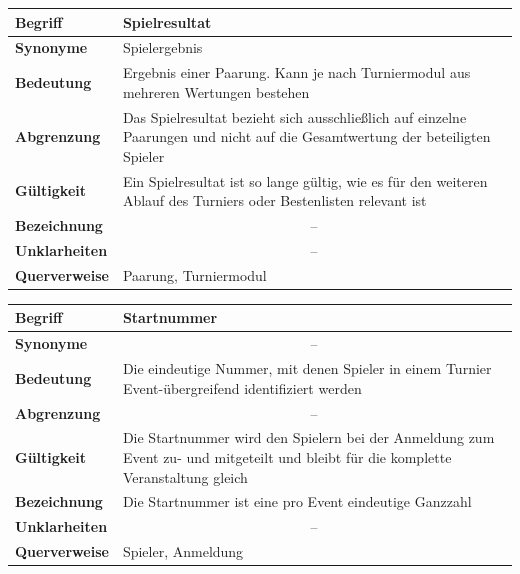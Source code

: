\documentclass[11pt]{article}
\begin{document}
\begin{tabularx}{\textwidth}{| p{} | p{} |}
	\hline
	\textbf{Begriff} & Spielresultat\\
	\hline
	\textbf{Synonyme} & Spielergebnis \\
	\hline
	\textbf{Bedeutung} & Ergebnis einer Paarung. Kann je nach Turniermodul aus mehreren Wertungen bestehen\\
	\hline
	\textbf{Abgrenzung} & Das Spielresultat bezieht sich ausschließlich auf einzelne Paarungen und nicht auf die Gesamtwertung der beteiligten Spieler\\
	\hline
	\textbf{Gültigkeit} & Ein Spielresultat ist so lange gültig, wie es für den weiteren Ablauf des Turniers oder Bestenlisten relevant ist \\
	\hline
	\textbf{Bezeichnung} & \multicolumn{1}{c|}{--} \\
	\hline
	\textbf{Unklarheiten} & \multicolumn{1}{c|}{--} \\
	\hline
	\textbf{Querverweise} & Paarung, Turniermodul\\
	\hline
\end{tabularx}

\begin{tabularx}{\textwidth}{| p{} | p{} |}
	\hline
	\textbf{Begriff} & Startnummer\\
	\hline
	\textbf{Synonyme} & \multicolumn{1}{c|}{--} \\
	\hline
	\textbf{Bedeutung} & Die eindeutige Nummer, mit denen Spieler in einem Turnier Event-übergreifend identifiziert werden\\
	\hline
	\textbf{Abgrenzung} & \multicolumn{1}{c|}{--} \\
	\hline
	\textbf{Gültigkeit} & Die Startnummer wird den Spielern bei der Anmeldung zum Event zu- und mitgeteilt und bleibt für die komplette Veranstaltung gleich\\
	\hline
	\textbf{Bezeichnung} & Die Startnummer ist eine pro Event eindeutige Ganzzahl\\
	\hline
	\textbf{Unklarheiten} & \multicolumn{1}{c|}{--} \\
	\hline
	\textbf{Querverweise} & Spieler, Anmeldung \\
	\hline
\end{tabularx}

\newpage
\end{document}

